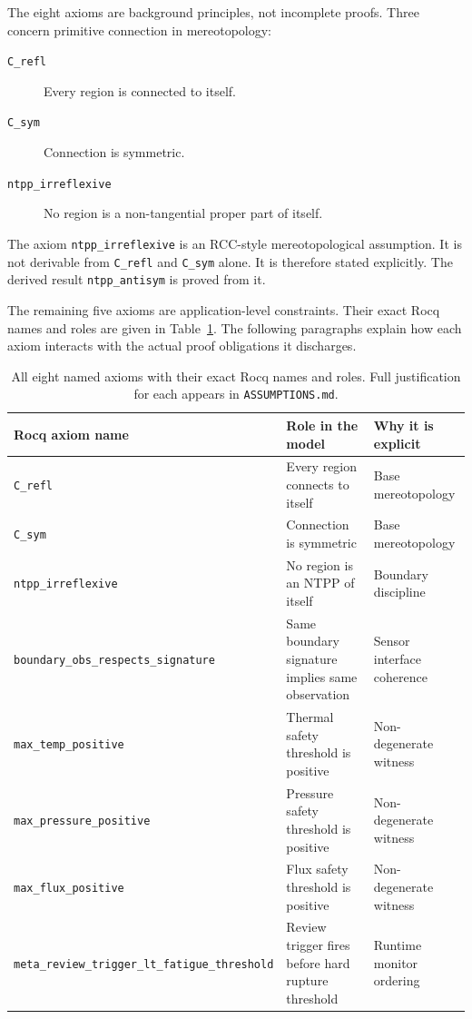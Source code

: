 \documentclass[a4paper,11pt]{article}
\begin{document}
The eight axioms are background principles, not incomplete proofs. Three concern
primitive connection in mereotopology:

\begin{description}
\item[\texttt{C\_refl}] Every region is connected to itself.
\item[\texttt{C\_sym}] Connection is symmetric.
\item[\texttt{ntpp\_irreflexive}] No region is a non-tangential proper part of
itself.
\end{description}

The axiom \texttt{ntpp\_irreflexive} is an RCC-style mereotopological
assumption. It is not derivable from \texttt{C\_refl} and \texttt{C\_sym}
alone. It is therefore stated explicitly. The derived result
\texttt{ntpp\_antisym} is proved from it.

The remaining five axioms are application-level constraints. Their exact Rocq
names and roles are given in Table~\ref{tab:axiom-roles}. The following
paragraphs explain how each axiom interacts with the actual proof obligations
it discharges.

\begin{table}[h]
\centering
\small
\begin{tabular}{p{3.8cm}p{4.0cm}p{3.2cm}}
\toprule
Rocq axiom name & Role in the model & Why it is explicit \\
\midrule
\texttt{C\_refl}
  & Every region connects to itself
  & Base mereotopology \\[3pt]
\texttt{C\_sym}
  & Connection is symmetric
  & Base mereotopology \\[3pt]
\texttt{ntpp\_irreflexive}
  & No region is an NTPP of itself
  & Boundary discipline \\[3pt]
\texttt{boundary\_obs\_\allowbreak{}respects\_\allowbreak{}signature}
  & Same boundary signature implies same observation
  & Sensor interface coherence \\[3pt]
\texttt{max\_temp\_positive}
  & Thermal safety threshold is positive
  & Non-degenerate witness \\[3pt]
\texttt{max\_pressure\_positive}
  & Pressure safety threshold is positive
  & Non-degenerate witness \\[3pt]
\texttt{max\_flux\_positive}
  & Flux safety threshold is positive
  & Non-degenerate witness \\[3pt]
\texttt{meta\_review\_\allowbreak{}trigger\_lt\_\allowbreak{}fatigue\_threshold}
  & Review trigger fires before hard rupture threshold
  & Runtime monitor ordering \\
\bottomrule
\end{tabular}
\caption{All eight named axioms with their exact Rocq names and roles.
  Full justification for each appears in \texttt{ASSUMPTIONS.md}.}
\label{tab:axiom-roles}
\end{table}
\end{document}
